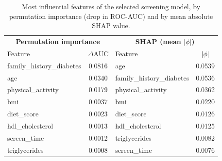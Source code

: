 \begin{table}[!t]
\renewcommand{\arraystretch}{1.2}
\caption{Most influential features of the selected screening model, by
permutation importance (drop in ROC-AUC) and by mean absolute SHAP value.}
\label{tab:importance}
\centering
\begin{tabular}{l c | l c}
\toprule
\multicolumn{2}{c|}{\textbf{Permutation importance}} & \multicolumn{2}{c}{\textbf{SHAP (mean $|\phi|$)}} \\
Feature & $\Delta$AUC & Feature & $|\phi|$ \\
\midrule
family\_history\_diabetes & 0.0816 & age & 0.0539 \\
age & 0.0340 & family\_history\_diabetes & 0.0536 \\
physical\_activity & 0.0179 & physical\_activity & 0.0362 \\
bmi & 0.0037 & bmi & 0.0220 \\
diet\_score & 0.0023 & diet\_score & 0.0126 \\
hdl\_cholesterol & 0.0013 & hdl\_cholesterol & 0.0125 \\
screen\_time & 0.0012 & triglycerides & 0.0082 \\
triglycerides & 0.0008 & screen\_time & 0.0076 \\
\bottomrule
\end{tabular}
\end{table}
